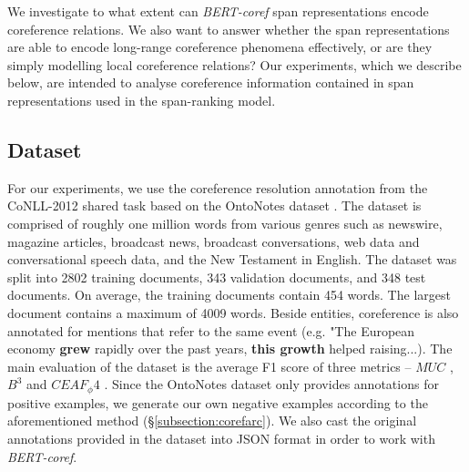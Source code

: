 \documentclass[11pt]{article}
\begin{document}


We investigate to what extent can \textit{BERT-coref} span representations encode coreference relations. We also want to answer whether the span representations are able to encode long-range coreference phenomena effectively, or are they simply modelling local coreference relations? Our experiments, which we describe below, are intended to analyse coreference information contained in span representations used in the span-ranking model. 

\subsection{Dataset}
For our experiments, we use the coreference resolution annotation
from the CoNLL-2012 shared task based on the OntoNotes dataset \parencite{conll}. The dataset is comprised of roughly one million words from various genres such as newswire, magazine articles, broadcast news, broadcast conversations, web data and conversational speech data, and the New Testament in English. The dataset was split into 2802 training documents, 343 validation documents, and 348 test documents. On average, the training documents contain 454 words. The largest document contains a maximum of 4009 words. Beside entities, coreference is also annotated for mentions that refer to the same event (e.g. "The European economy \textbf{grew} rapidly over the past years, \textbf{this growth} helped raising...). The main evaluation of the dataset is the average F1 score of three metrics – $MUC$ \parencite{vilain-etal-1995-model}, $B^3$ \parencite{Bagga98algorithmsfor} and $CEAF_ \phi4$ \parencite{luo-2005-coreference}. Since the OntoNotes dataset only provides annotations for positive examples, we generate our own negative examples according to the aforementioned method (\S \ref{subsection:corefarc}). We also cast the original annotations provided in the dataset into JSON format in order to work with \textit{BERT-coref}. 
\end{document}
